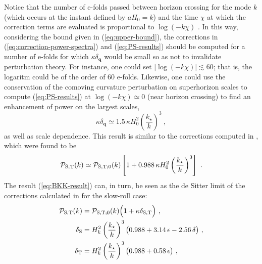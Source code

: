 \documentclass[12pt]{iopart}
\def\eq#1{\begin{equation}\begin{aligned}#1\end{aligned}\end{equation}}
\def\eref#1{(\ref{eq:#1})}
\def\q{\mathbf{q}}
\begin{document}
Notice that the number of e-folds passed between horizon crossing for the mode $k$ (which occurs at the instant defined by $aH_0 = k$) and the time $\chi$ at which the correction terms are evaluated is proportional to $\log(-k\chi)$ \citep{Burgess:2009bs,Seery:2010kh}. In this way, considering the bound given in \eref{upper-bound}, the corrections in \eref{correction-power-spectra} and \eref{PS-results} should be computed for a number of e-folds for which $\kappa\delta_{\q}$ would be small so as not to invalidate perturbation theory. For instance, one could set $|\log(-k\chi)|\lesssim60$; that is, the logaritm could be of the order of $60$ e-folds. Likewise, one could use the conservation of the comoving curvature perturbation on superhorizon scales to compute \eref{PS-results} at $\log(-k\chi)\simeq 0$ (near horizon crossing) to find an enhancement of power on the largest scales,
\begin{equation}\label{eq:delta-q-value}
\kappa\delta_{\q} \simeq 1.5\,\kappa H_0^2\left(\frac{k_{\star}}{k}\right)^3 \ , 
\end{equation}
as well as scale dependence. This result is similar to the corrections computed in \citet{Brizuela:2015tzl}, which were found to be
\eq{\label{eq:BKK-result}
{\cal P}_{\text{S},\text{T}}(k) \simeq {\cal P}_{\text{S},\text{T};0}(k)\left[1 + 0.988\,\kappa H_0^2\left(\frac{k_{\star}}{k}\right)^3\right] \ .
}
The result \eref{BKK-result} can, in turn, be seen as the de Sitter limit of the corrections calculated in \citet{Brizuela:2016gnz} for the slow-roll case:
\eq{\label{eq:PS-SlowRoll}
{\cal P}_{\text{S,T}}(k) &=
 {\cal P}_{\text{S,T};0}(k)\Big(1+\kappa\delta_{\text{S,T}}\Big)\ ,\\
\delta_{\text{S}} &= H_k^2\left(\frac{k_{\star}}{k}\right)^3\bigl(0.988+3.14\,\epsilon - 2.56\,\delta\bigr)\ ,\\
\delta_\text{T}&= H_k^2\left(\frac{k_{\star}}{k}\right)^3\bigl(0.988+0.58\,\epsilon\bigr)\ ,
}
\end{document}
